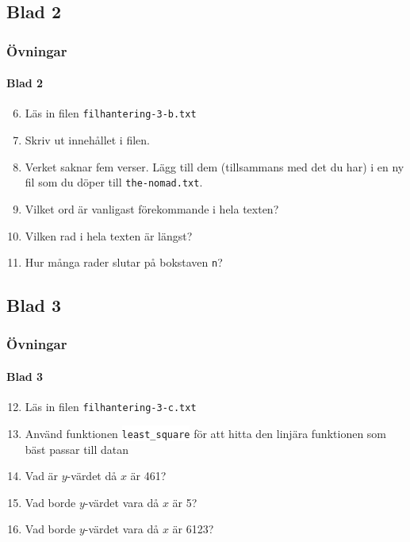 \documentclass[aspectratio=169]{beamer}
\newcommand{\code}[1]{\colorbox{white}{\lstinline{#1}}}
\begin{document}
\subsection{Blad 2}

\begin{frame}
	\frametitle{Övningar}
	\framesubtitle{Blad 2}
	
	\begin{enumerate}
		\setcounter{enumi}{5}
		\item Läs in filen \texttt{filhantering-3-b.txt}
		\item Skriv ut innehållet i filen.
		\item Verket saknar fem verser. Lägg till dem (tillsammans med det du har) i en ny fil som du döper till \texttt{the-nomad.txt}.
		\item Vilket ord är vanligast förekommande i hela texten?
		\item Vilken rad i hela texten är längst?
		\item Hur många rader slutar på bokstaven \texttt{n}?
	\end{enumerate}

\end{frame}

\subsection{Blad 3}

\begin{frame}[fragile]
	\frametitle{Övningar}
	\framesubtitle{Blad 3}
	
	\begin{enumerate}
		\setcounter{enumi}{11}
		\item Läs in filen \texttt{filhantering-3-c.txt}
		\item Använd funktionen \code{least_square} för att hitta den linjära funktionen som bäst passar till datan
		\item Vad är \(y\)-värdet då \(x\) är 461?
		\item Vad borde \(y\)-värdet vara då \(x\) är 5?
		\item Vad borde \(y\)-värdet vara då \(x\) är 6123?
	\end{enumerate}
	
\end{frame}
\end{document}

